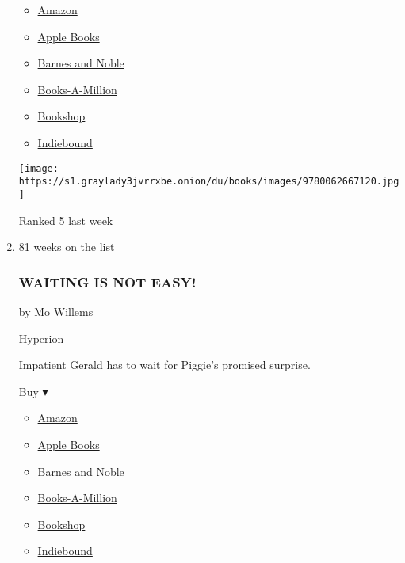 \begin{enumerate}
  \begin{itemize}
  \tightlist
  \item
    \href{https://www.amazon.com/I-Am-Enough-Grace-Byers/dp/0062667122?tag=NYTBS-20}{Amazon}
  \item
    \href{https://du-gae-books-dot-nyt-du-prd.appspot.com/buy?title=I+AM+ENOUGH\&author=Grace+Byers}{Apple
    Books}
  \item
    \href{https://www.anrdoezrs.net/click-7990613-11819508?url=https\%3A\%2F\%2Fwww.barnesandnoble.com\%2Fw\%2F\%3Fean\%3D9780062667120}{Barnes
    and Noble}
  \item
    \href{https://www.anrdoezrs.net/click-7990613-35140?url=https\%3A\%2F\%2Fwww.booksamillion.com\%2Fp\%2FI\%2BAM\%2BENOUGH\%2FGrace\%2BByers\%2F9780062667120}{Books-A-Million}
  \item
    \href{https://bookshop.org/a/3546/9780062667120}{Bookshop}
  \item
    \href{https://www.indiebound.org/book/9780062667120?aff=NYT}{Indiebound}
  \end{itemize}

  \texttt{[image: https://s1.graylady3jvrrxbe.onion/du/books/images/9780062667120.jpg]}

  Ranked 5 last week
\item
  81 weeks on the list

  \hypertarget{waiting-is-not-easy}{%
  \subsubsection{WAITING IS NOT EASY!}\label{waiting-is-not-easy}}

  by Mo Willems

  Hyperion

  Impatient Gerald has to wait for Piggie's promised surprise.

  Buy ▾

  \begin{itemize}
  \tightlist
  \item
    \href{http://www.amazon.com/Waiting-Easy-Elephant-Piggie-Book/dp/142319957X?tag=NYTBS-20}{Amazon}
  \item
    \href{https://du-gae-books-dot-nyt-du-prd.appspot.com/buy?title=WAITING+IS+NOT+EASY\%21\&author=Mo+Willems}{Apple
    Books}
  \item
    \href{https://www.anrdoezrs.net/click-7990613-11819508?url=https\%3A\%2F\%2Fwww.barnesandnoble.com\%2Fw\%2F\%3Fean\%3D9781423199571}{Barnes
    and Noble}
  \item
    \href{https://www.anrdoezrs.net/click-7990613-35140?url=https\%3A\%2F\%2Fwww.booksamillion.com\%2Fp\%2FWAITING\%2BIS\%2BNOT\%2BEASY\%2521\%2FMo\%2BWillems\%2F9781423199571}{Books-A-Million}
  \item
    \href{https://bookshop.org/a/3546/9781423199571}{Bookshop}
  \item
    \href{https://www.indiebound.org/book/9781423199571?aff=NYT}{Indiebound}
  \end{itemize}


\end{enumerate}
